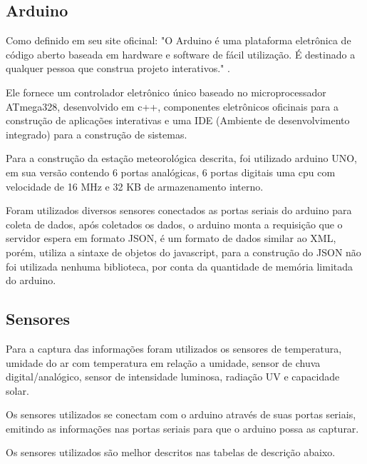 \subsection{Arduino}
\label{sec:arduino}

Como definido em seu site oficinal: "O Arduino é uma plataforma eletrônica de código aberto baseada em hardware e software de fácil utilização. É destinado a qualquer pessoa que construa projeto interativos." \cite{arduino_about}.

Ele fornece um controlador eletrônico único baseado no microprocessador ATmega328, desenvolvido em c++, componentes eletrônicos oficinais para a construção de aplicações interativas e uma IDE (Ambiente de desenvolvimento integrado) para a construção de sistemas.

Para a construção da estação meteorológica descrita, foi utilizado arduino UNO, em sua versão contendo 6 portas analógicas, 6 portas digitais uma cpu com velocidade de 16 MHz e 32 KB de armazenamento interno.

Foram utilizados diversos sensores conectados as portas seriais do arduino para coleta de dados, após coletados os dados, o arduino monta a requisição que o servidor espera em formato JSON, é um formato de dados similar ao XML, porém, utiliza a sintaxe de objetos do javascript, para a construção do JSON não foi utilizada nenhuma biblioteca, por conta da quantidade de memória limitada do arduino.

\subsection{Sensores}
\label{sec:sensores}

Para a captura das informações foram utilizados os sensores de temperatura, umidade do ar com temperatura em relação a umidade, sensor de chuva digital/analógico, sensor de intensidade luminosa, radiação UV e capacidade solar.

Os sensores utilizados se conectam com o arduino através de suas portas seriais, emitindo as informações nas portas seriais para que o arduino possa as capturar.

Os sensores utilizados são melhor descritos nas tabelas de descrição abaixo.


